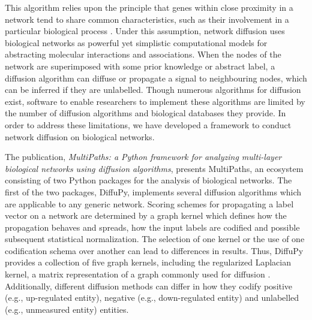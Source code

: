 This algorithm relies upon the principle that genes within close proximity in a network tend to share common characteristics, such as their involvement in a particular biological process \parencite{cowen2017}. Under this assumption, network diffusion uses biological networks as powerful yet simplistic computational models for abstracting molecular interactions and associations. When the nodes of the network are superimposed with some prior knowledge or abstract label, a diffusion algorithm can diffuse or propagate a signal to neighbouring nodes, which can be inferred if they are unlabelled. Though numerous algorithms for diffusion exist, software to enable researchers to implement these algorithms are limited by the number of diffusion algorithms and biological databases they provide. In order to address these limitations, we have developed a framework to conduct network diffusion on biological networks.  
 
The publication, \textit{MultiPaths: a Python framework for analyzing multi-layer biological networks using diffusion algorithms}, presents MultiPaths, an ecosystem consisting of two Python packages for the analysis of biological networks. The first of the two packages, DiffuPy, implements several diffusion algorithms which are applicable to any generic network. Scoring schemes for propagating a label vector on a network are determined by a graph kernel which defines how the propagation behaves and spreads, how the input labels are codified and possible subsequent statistical normalization. The selection of one kernel or the use of one codification schema over another can lead to differences in results. Thus, DiffuPy provides a collection of five graph kernels, including the regularized Laplacian kernel, a matrix representation of a graph commonly used for diffusion \parencite{cowen2017}. Additionally, different diffusion methods can differ in how they codify positive (e.g., up-regulated entity), negative (e.g., down-regulated entity) and unlabelled (e.g., unmeasured entity) entities.

